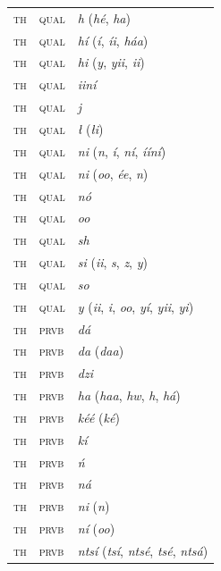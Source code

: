 \begin{xltabular}{\textwidth}{llX}
 \textsc{th} & \textsc{qual} & \textit{h} (\textit{hé}, \textit{ha})\\
 \textsc{th} & \textsc{qual} & \textit{hí} (\textit{í}, \textit{íi}, \textit{háa})\\
 \textsc{th} & \textsc{qual} & \textit{hi} (\textit{y}, \textit{yii}, \textit{ii})\\
 \textsc{th} & \textsc{qual} & \textit{iiní}\\
 \textsc{th} & \textsc{qual} & \textit{j}\\
 \textsc{th} & \textsc{qual} & \textit{ł} (\textit{łi})\\
 \textsc{th} & \textsc{qual} & \textit{ni} (\textit{n},\textit{ í}, \textit{ní}, \textit{ííní})\\
 \textsc{th} & \textsc{qual} & \textit{ni} (\textit{oo}, \textit{ée}, \textit{n})\\
 \textsc{th} & \textsc{qual} & \textit{nó}\\
 \textsc{th} & \textsc{qual} & \textit{oo}\\
 \textsc{th} & \textsc{qual} & \textit{sh}\\
 \textsc{th} & \textsc{qual} & \textit{si} (\textit{ii}, \textit{s}, \textit{z}, \textit{y})\\
 \textsc{th} & \textsc{qual} & \textit{so}\\
 \textsc{th} & \textsc{qual} & \textit{y} (\textit{ii}, \textit{i}, \textit{oo}, \textit{yí}, \textit{yii}, \textit{yi})\\
 \textsc{th} & \textsc{prvb} & \textit{dá}\\
 \textsc{th} & \textsc{prvb} & \textit{da} (\textit{daa})\\
 \textsc{th} & \textsc{prvb} & \textit{dzi}\\
 \textsc{th} & \textsc{prvb} & \textit{ha} (\textit{haa}, \textit{hw}, \textit{h}, \textit{há})\\
 \textsc{th} & \textsc{prvb} & \textit{kéé} (\textit{ké})\\
 \textsc{th} & \textsc{prvb} & \textit{kí}\\
 \textsc{th} & \textsc{prvb} & \textit{ń}\\
 \textsc{th} & \textsc{prvb} & \textit{ná}\\
 \textsc{th} & \textsc{prvb} & \textit{ni} (\textit{n})\\
 \textsc{th} & \textsc{prvb} & \textit{ní} (\textit{oo})\\
 \textsc{th} & \textsc{prvb} & \textit{ntsí} (\textit{tsí}, \textit{ntsé}, \textit{tsé}, \textit{ntsá})\\

\end{xltabular}
